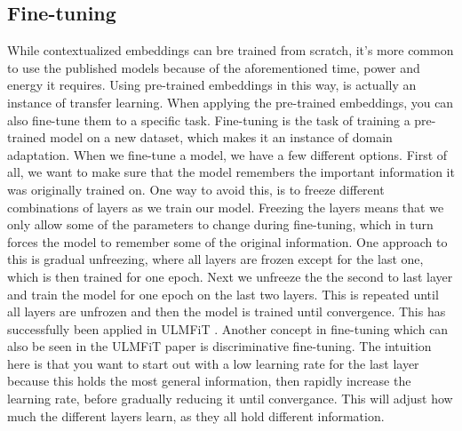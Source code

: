 \subsection{Fine-tuning}
While contextualized embeddings can bre trained from scratch, it's more common to use the published models because of the aforementioned time, power and energy it requires. Using pre-trained embeddings in this way, is actually an instance of transfer learning. When applying the pre-trained embeddings, you can also fine-tune them to a specific task. Fine-tuning is the task of training a pre-trained model on a new dataset, which makes it an instance of domain adaptation. When we fine-tune a model, we have a few different options. First of all, we want to make sure that the model remembers the important information it was originally trained on. One way to avoid this, is to freeze different combinations of layers as we train our model. Freezing the layers means that we only allow some of the parameters to change during fine-tuning, which in turn forces the model to remember some of the original information. One approach to this is gradual unfreezing, where all layers are frozen except for the last one, which is then trained for one epoch. Next we unfreeze the the second to last layer and train the model for one epoch on the last two layers. This is repeated until all layers are unfrozen and then the model is trained until convergence. This has successfully been applied in ULMFiT \cite{howard-ruder-2018-universal}. Another concept in fine-tuning which can also be seen in the ULMFiT paper is discriminative fine-tuning. The intuition here is that you want to start out with a low learning rate for the last layer because this holds the most general information, then rapidly increase the learning rate, before gradually reducing it until convergance. This will adjust how much the different layers learn, as they all hold different information. 





